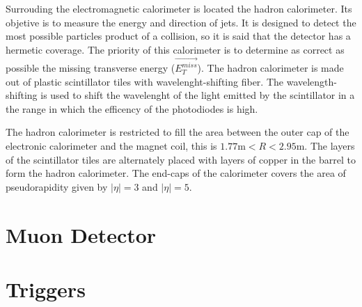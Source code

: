 Surrouding the electromagnetic calorimeter is located the hadron calorimeter. Its objetive is to measure the energy and direction of jets. It is designed to detect the most possible particles product of a collision, so it is said that the detector has a hermetic coverage. The priority of this calorimeter is to determine as correct as possible the missing transverse energy ($\vec{E_T^{miss}}$). The hadron calorimeter is made out of plastic scintillator tiles with wavelenght-shifting fiber. The wavelength-shifting is used to shift the wavelenght of the light emitted by the scintillator in a the range in which the efficency of the photodiodes is high.

The hadron calorimeter is restricted to fill the area between the outer cap of the electronic calorimeter and the magnet coil, this is $1.77 \text{m} < R < 2.95\text{m}$. The layers of the scintillator tiles are alternately placed with layers of copper in the barrel to form the hadron calorimeter. The end-caps of the calorimeter covers the area of pseudorapidity given by $|\eta|= 3$ and $|\eta|= 5$.


\section{Muon Detector}


\section{Triggers}








